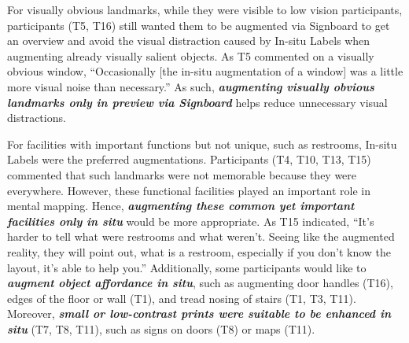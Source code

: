 For visually obvious landmarks, while they were visible to low vision participants, participants (T5, T16) still wanted them to be augmented via Signboard to get an overview and avoid the visual distraction caused by In-situ Labels when augmenting already visually salient objects. 
As T5 commented on a visually obvious window, ``Occasionally [the in-situ augmentation of a window] was a little more visual noise than necessary.'' As such, \textbf{\textit{augmenting visually obvious landmarks only in preview via Signboard}} helps reduce unnecessary visual distractions.

For facilities with important functions but not unique, such as restrooms, In-situ Labels were the preferred augmentations. Participants (T4, T10, T13, T15) commented that such landmarks were not memorable because they were everywhere. However, these functional facilities played an important role in mental mapping. %
Hence, \textbf{\textit{augmenting these common yet important facilities only in situ}} would be more appropriate. 
As T15 indicated, ``It's harder to tell what were restrooms and what weren't. Seeing like the augmented reality, they will point out, what is a restroom, especially if you don't know the layout, it's able to help you.'' Additionally, some participants would like to \textbf{\textit{augment object affordance in situ}}, such as augmenting door handles (T16), edges of the floor or wall (T1), and tread nosing of stairs (T1, T3, T11). 
Moreover, \textbf{\textit{small or low-contrast prints were suitable to be enhanced in situ}} (T7, T8, T11), such as signs on doors (T8) or maps (T11). %



